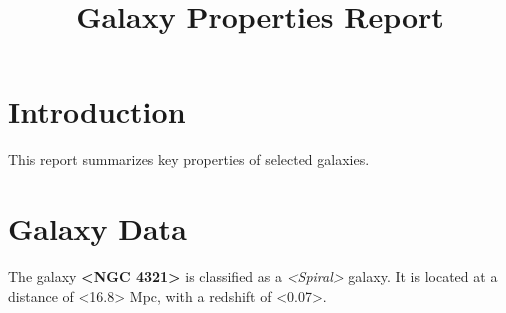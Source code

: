 \documentclass{article}
\title{Galaxy Properties Report}
\author{}
\date{}
\begin{document}
\maketitle

\section{Introduction}
This report summarizes key properties of selected galaxies.

\section{Galaxy Data}
The galaxy \textbf{<NGC 4321>} is classified as a \textit{<Spiral>} galaxy. 
It is located at a distance of <16.8> Mpc, with a redshift of <0.07>.
\end{document}
